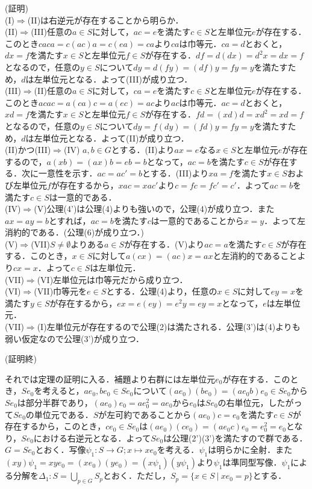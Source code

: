 \documentclass{jsarticle}
\begin{document}
(証明)\\
(I)$\Rightarrow$(II)は右逆元が存在することから明らか．\\
(II)$\Rightarrow$(III)任意の$a\in S$に対して，$ac=e$を満たす$c\in S$と左単位元$e$が存在する．このとき$caca=c(ac)a=c(ea)=ca$より$ca$は巾等元．$ca=d$とおくと，$dx=f$を満たす$x\in S$と左単位元$f\in S$が存在する．$df=d(dx)=d^2x=dx=f$となるので，任意の$y\in S$について$dy=d(fy)=(df)y=fy=y$を満たすため，$d$は左単位元となる．よって(III)が成り立つ．\\
(III)$\Rightarrow$(II)任意の$a\in S$に対して，$ca=e$を満たす$c\in S$と左単位元$e$が存在する．このとき$acac=a(ca)c=a(ec)=ac$より$ac$は巾等元．$ac=d$とおくと，$xd=f$を満たす$x\in S$と左単位元$f\in S$が存在する．$fd=(xd)d=xd^2=xd=f$となるので，任意の$y\in S$について$dy=f(dy)=(fd)y=fy=y$を満たすため，$d$は左単位元となる．よって(II)が成り立つ．\\
(II)かつ(III)$\Rightarrow$(IV) $a,b\in G$とする．(II)より$ax=e$なる$x\in S$と左単位元$e$が存在するので，$a(xb)=(ax)b=eb=b$となって，$ac=b$を満たす$c\in S$が存在する．次に一意性を示す．$ac=ac'=b$とする．(III)より$xa=f$を満たす$x\in S$および左単位元$f$が存在するから，$xac=xac'$より$c=fc=fc'=c'$．よって$ac=b$を満たす$c\in S$は一意的である．\\
(IV)$\Rightarrow$(V)公理(4')は公理(4)よりも強いので，公理(4)が成り立つ．また$ax=ay=b$とすれば，$ac=b$を満たす$c$は一意的であることから$x=y$．よって左消約的である．(公理(6)が成り立つ．)\\
(V)$\Rightarrow$(VII)$S\neq\emptyset$よりある$a\in S$が存在する．(V)より$ac=a$を満たす$c\in S$が存在する．このとき，$x\in S$に対して$a(cx)=(ac)x=ax$と左消約的であることより$cx=x$．よって$c\in S$は左単位元．\\
(VII)$\Rightarrow$(VI)左単位元は巾等元だから成り立つ．\\
(VI)$\Rightarrow$(VII)巾等元を$e\in S$とする．公理(4)より，任意の$x\in S$に対して$ey=x$を満たす$y\in S$が存在するから，$ex=e(ey)=e^2y=ey=x$となって，$e$は左単位元．\\
(VII)$\Rightarrow$(I)左単位元が存在するので公理(2)は満たされる．公理(3')は(4)よりも弱い仮定なので公理(3')が成り立つ．
\begin{flushright}
(証明終)
\end{flushright}
それでは定理の証明に入る．補題より右群には左単位元$e_0$が存在する．このとき，$Se_0$を考えると，$ae_0,be_0\in Se_0$について$(ae_0)(be_0)=(ae_0b)e_0\in Se_0$から$Se_0$は部分半群であり，$(ae_0)e_0=ae_0^2=ae_0$から$e_0$は$Se_0$の右単位元，したがって$Se_0$の単位元である．$S$が左可約であることから$(ae_0)c=e_0$を満たす$c\in S$が存在するから，このとき，$ce_0\in Se_0$は$(ae_0)(ce_0)=(ae_0c)e_0=e_0^2=e_0$となり，$Se_0$における右逆元となる．よって$Se_0$は公理(2')(3')を満たすので群である．$G=Se_0$とおく．写像$\psi_1:S\rightarrow G;x\mapsto xe_0$を考える．$\psi_1$は明らかに全射．また$(xy)\psi_1=xye_0=(xe_0)(ye_0)=(x\psi_1)(y\psi_1)$より$\psi_1$は準同型写像．$\psi_1$による分解を$\Delta_1:S=\displaystyle\bigcup_{p\in G}S_p$とおく．ただし，$S_p=\{x\in S\:|\:xe_0=p\}$とする．\\
\end{document}
